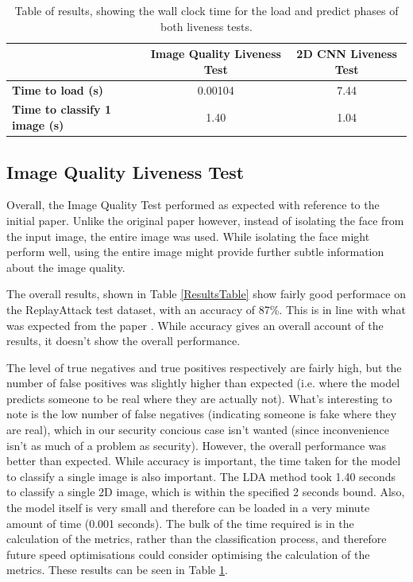 \documentclass[11pt,a4paper]{article}
\begin{document}
    \begin{table}[ht]
        \centering
        \begin{tabular}[t]{lcc}
            \toprule
             & \textbf{Image Quality Liveness Test} & \textbf{2D CNN Liveness Test}\\
             \midrule
            \textbf{Time to load (s)} & 0.00104 & 7.44\\
            \textbf{Time to classify 1 image (s)} & 1.40 & 1.04\\
            \bottomrule
        \end{tabular}
        \caption{Table of results, showing the wall clock time for the load and predict phases of both liveness tests.}
        \label{WallClockResultsTime}
    \end{table}
    \subsection{Image Quality Liveness Test}
        Overall, the Image Quality Test performed as expected with reference to the initial paper. Unlike the original paper however, instead of isolating the face
        from the input image, the entire image was used. While isolating the face might perform well, using the entire image might provide further subtle information
        about the image quality.

        The overall results, shown in Table \ref{ResultsTable} show fairly good performace on the ReplayAttack test dataset, with an accuracy of 87\%. This is in line with
        what was expected from the paper \cite{ImageQualityAssessmentTest}. While accuracy gives an overall account of the results, it doesn't show the overall performance.
        
        The level of true negatives and true positives respectively are fairly high, but the number of false positives was slightly higher than expected (i.e. where the model predicts someone to be real where they are actually not).
        What's interesting to note is the low number of false negatives (indicating someone is fake where they are real), which in our security concious case isn't wanted (since inconvenience isn't as much of a problem as security).
        However, the overall performance was better than expected.
        While accuracy is important, the time taken for the model to classify a single image is also important. The LDA method took 1.40 seconds to classify a single 2D image, which is within the specified 2 seconds bound.
        Also, the model itself is very small and therefore can be loaded in a very minute amount of time (0.001 seconds). The bulk of the time required is in the calculation of the metrics, rather than the classification process,
        and therefore future speed optimisations could consider optimising the calculation of the metrics. These results can be seen in Table \ref{WallClockResultsTime}.
\end{document}
